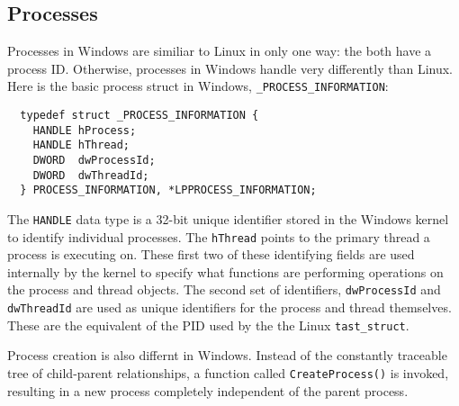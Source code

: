   \subsection{Processes}
Processes in Windows are similiar to Linux in only one way: the both have a
process ID. Otherwise, processes in Windows handle very differently than Linux.
Here is the basic process struct in Windows, \texttt{\_PROCESS\_INFORMATION}:
\cite{msprocstruct2016}

\begin{lstlisting}
  typedef struct _PROCESS_INFORMATION {
    HANDLE hProcess;
    HANDLE hThread;
    DWORD  dwProcessId;
    DWORD  dwThreadId;
  } PROCESS_INFORMATION, *LPPROCESS_INFORMATION;
\end{lstlisting}

The \texttt{HANDLE} data type is a 32-bit unique identifier stored in the Windows
kernel to identify individual processes.\cite{mshandle2016} The \texttt{hThread}
points to the primary thread a process is executing on. These first two of these
identifying fields are used internally by the kernel to specify what functions
are performing operations on the process and thread objects. The second set of
identifiers, \texttt{dwProcessId} and \texttt{dwThreadId} are used as unique
identifiers for the process and thread themselves. These are the equivalent of
the PID used by the the Linux \texttt{tast\_struct}.

Process creation is also differnt in Windows. Instead of the constantly traceable
tree of child-parent relationships, a function called \texttt{CreateProcess()} is
invoked, resulting in a new process completely independent of the parent process.
\cite{msproccreate2016}


